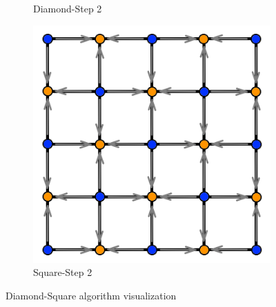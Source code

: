 \documentclass[11pt,a4paper,twoside,openright]{report}
\begin{document}
\begin{figure}[H]
\begin{subfigure}[b]{0.25\textwidth}
    \caption{Diamond-Step 2}
    \label{fig:ds4}
  \end{subfigure}
  \begin{subfigure}[b]{0.25\textwidth}
    \includegraphics[width=\textwidth]{ds5.png}
    \caption{Square-Step 2}
    \label{fig:ds5}
  \end{subfigure}
  \caption{Diamond-Square algorithm visualization}
\end{figure}
\end{document}
